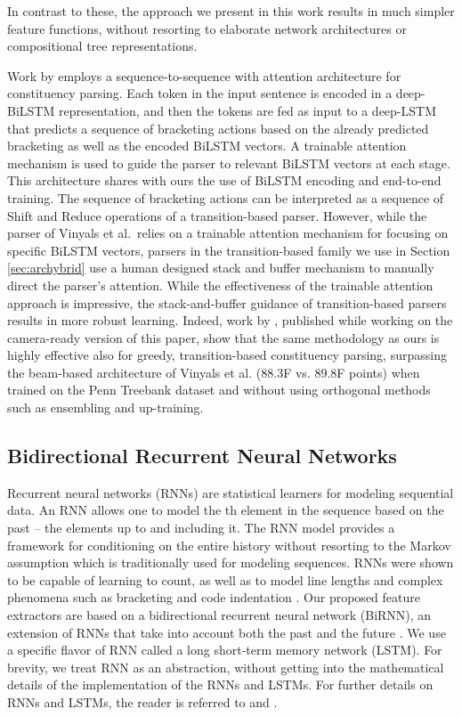 \documentclass[11pt]{article}
\begin{document}
In contrast to these, the approach we present in this work results in much
simpler feature functions, without resorting to elaborate network architectures or compositional tree representations.

Work by  employs a
sequence-to-sequence with attention architecture for constituency parsing.
Each token in the input sentence is encoded in a deep-BiLSTM representation, and
then the tokens are fed as input to a deep-LSTM that predicts a sequence of
bracketing actions based on the already predicted bracketing as well as the encoded BiLSTM
vectors. A trainable attention mechanism is used to guide the parser to relevant
\mbox{BiLSTM} vectors at each stage.  This architecture shares with ours the use of
BiLSTM encoding and end-to-end training.  The sequence of bracketing actions
can be interpreted as a sequence of Shift and Reduce operations of a transition-based parser. However, while the
parser of Vinyals et al.\ relies on a trainable attention mechanism for focusing on specific 
BiLSTM vectors, parsers in the transition-based family we use in Section
\ref{sec:archybrid} use a human designed stack and buffer mechanism to manually direct the
parser's attention.  While the effectiveness of the trainable attention approach
is impressive, the stack-and-buffer guidance of transition-based parsers results
in more robust learning.
Indeed, work by , published while working on the camera-ready
version of this paper, show that the same methodology as ours is highly effective also for
greedy, transition-based constituency parsing, surpassing the beam-based architecture of
Vinyals et al. (88.3F vs. 89.8F points) when trained on the Penn Treebank dataset and without
using orthogonal methods such as ensembling and up-training.

\subsection{Bidirectional Recurrent Neural Networks}
\label{subsec:birnn}
Recurrent neural networks (RNNs) are statistical
learners for modeling sequential data. An RNN allows one to model the th element in the sequence
based on the past -- the elements  up to and including it. The RNN model provides a framework for
conditioning on the entire history  without resorting to the Markov assumption
which is traditionally used for modeling sequences. RNNs were shown to be
capable of learning to count, as well as to model line lengths and complex
phenomena such as bracketing and code indentation \cite{karpathy2015visualizing}.
Our proposed feature extractors are based on a bidirectional recurrent neural network
(BiRNN), an extension of RNNs that take into account both the past  and the
future .  We use a specific flavor of RNN called a
long short-term memory network (LSTM).
For brevity, we treat RNN as an abstraction, without getting
into the mathematical details of the implementation of the RNNs and LSTMs.  For
further details on RNNs and LSTMs, the reader is referred to
 and .
\end{document}
